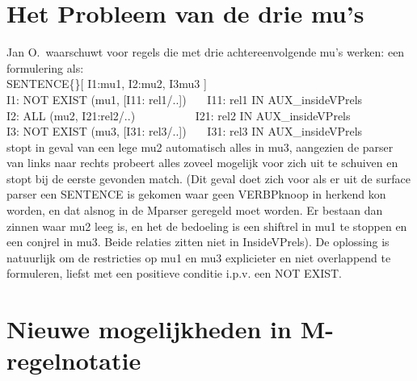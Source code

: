 \section{Het Probleem van de drie mu's}
Jan O.\ waarschuwt 
voor regels die met drie achtereenvolgende mu's werken: een formulering als: \\
SENTENCE\{\}[ I1:mu1, I2:mu2, I3mu3 ]\\
I1: NOT EXIST (mu1, [I11: rel1/..]) \ \ \  I11: rel1 IN AUX\_insideVPrels\\
I2: ALL (mu2, I21:rel2/..) \ \ \ \ \ \ \ \ \ \ I21: rel2 IN AUX\_insideVPrels\\
I3: NOT EXIST (mu3, [I31: rel3/..]) \ \ \  I31: rel3 IN AUX\_insideVPrels\\
stopt in geval van een lege mu2 automatisch alles in mu3, aangezien de parser 
van links naar rechts probeert alles zoveel mogelijk voor zich uit te schuiven 
en stopt bij de eerste gevonden match. (Dit geval doet zich voor als er uit de 
surface parser een SENTENCE is gekomen waar geen VERBPknoop in 
herkend kon worden, en dat alsnog in de Mparser geregeld moet worden. Er 
bestaan dan zinnen waar mu2 leeg is, en het de bedoeling is een shiftrel in mu1 
te stoppen en een conjrel in mu3. Beide relaties zitten niet in InsideVPrels). 
De oplossing is natuurlijk om de restricties op mu1 en mu3 explicieter en niet 
overlappend te formuleren, liefst met een positieve conditie i.p.v. een NOT 
EXIST.

\section{Nieuwe mogelijkheden in M-regelnotatie}
